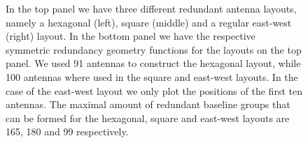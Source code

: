\documentclass[useAMS,usenatbib]{mn2e}
\begin{document}
\begin{figure}
\caption{In the top panel we have three different redundant antenna layouts, namely a hexagonal (left), square (middle) and a regular east-west (right) layout. 
In the bottom panel we have the respective symmetric redundancy geometry functions for the layouts on the top panel. We used 91 antennas
to construct the hexagonal layout, while 100 antennas where used in the square and east-west layouts. In the case of the east-west layout we only plot the positions of the first ten antennas. The maximal amount of redundant baseline groups that can be formed for 
the hexagonal, square and east-west layouts are 165, 180 and 99 respectively.\label{fig:geometry_function}}
\end{figure}
\end{document}
